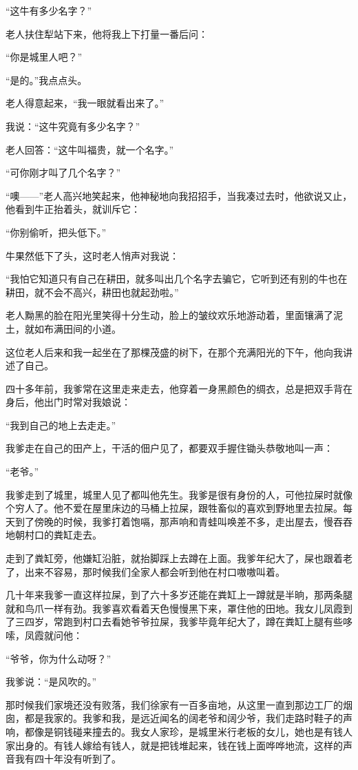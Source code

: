 \documentclass[12pt,UTF8]{ctexbook}
\begin{document}
“这牛有多少名字？”

老人扶住犁站下来，他将我上下打量一番后问：

“你是城里人吧？”

“是的。”我点点头。

老人得意起来，“我一眼就看出来了。”

我说：“这牛究竟有多少名字？”

老人回答：“这牛叫福贵，就一个名字。”

“可你刚才叫了几个名字？”

“噢——”老人高兴地笑起来，他神秘地向我招招手，当我凑过去时，他欲说又止，他看到牛正抬着头，就训斥它：

“你别偷听，把头低下。”

牛果然低下了头，这时老人悄声对我说：

“我怕它知道只有自己在耕田，就多叫出几个名字去骗它，它听到还有别的牛也在耕田，就不会不高兴，耕田也就起劲啦。”

老人黝黑的脸在阳光里笑得十分生动，脸上的皱纹欢乐地游动着，里面镶满了泥土，就如布满田间的小道。

这位老人后来和我一起坐在了那棵茂盛的树下，在那个充满阳光的下午，他向我讲述了自己。

四十多年前，我爹常在这里走来走去，他穿着一身黑颜色的绸衣，总是把双手背在身后，他出门时常对我娘说：

“我到自己的地上去走走。”

我爹走在自己的田产上，干活的佃户见了，都要双手握住锄头恭敬地叫一声：

“老爷。”

我爹走到了城里，城里人见了都叫他先生。我爹是很有身份的人，可他拉屎时就像个穷人了。他不爱在屋里床边的马桶上拉屎，跟牲畜似的喜欢到野地里去拉屎。每天到了傍晚的时候，我爹打着饱嗝，那声响和青蛙叫唤差不多，走出屋去，慢吞吞地朝村口的粪缸走去。

走到了粪缸旁，他嫌缸沿脏，就抬脚踩上去蹲在上面。我爹年纪大了，屎也跟着老了，出来不容易，那时候我们全家人都会听到他在村口嗷嗷叫着。

几十年来我爹一直这样拉屎，到了六十多岁还能在粪缸上一蹲就是半晌，那两条腿就和鸟爪一样有劲。我爹喜欢看着天色慢慢黑下来，罩住他的田地。我女儿凤霞到了三四岁，常跑到村口去看她爷爷拉屎，我爹毕竟年纪大了，蹲在粪缸上腿有些哆嗦，凤霞就问他：

“爷爷，你为什么动呀？”

我爹说：“是风吹的。”

那时候我们家境还没有败落，我们徐家有一百多亩地，从这里一直到那边工厂的烟囱，都是我家的。我爹和我，是远近闻名的阔老爷和阔少爷，我们走路时鞋子的声响，都像是铜钱碰来撞去的。我女人家珍，是城里米行老板的女儿，她也是有钱人家出身的。有钱人嫁给有钱人，就是把钱堆起来，钱在钱上面哗哗地流，这样的声音我有四十年没有听到了。
\end{document}
